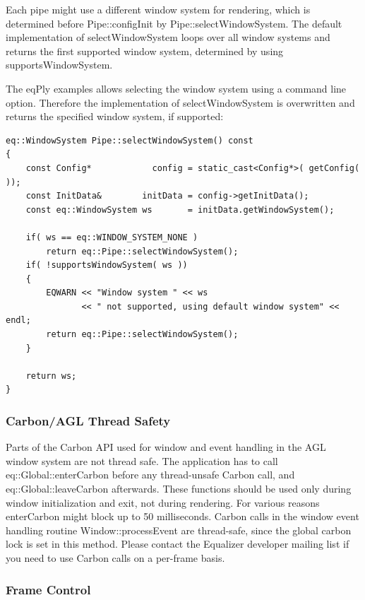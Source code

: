 \documentclass[10pt,a4]{scrartcl}
\begin{document}
Each pipe might use a different window system for rendering, which is
determined before \textsf{Pipe::configInit} by
\textsf{Pipe::selectWindowSystem}. The default implementation of
\textsf{selectWindowSystem} loops over all window systems and returns
the first supported window system, determined by using
\textsf{supportsWindowSystem}.

The \textsf{eqPly} examples allows selecting the window system using a
command line option. Therefore the implementation of
\textsf{selectWindowSystem} is overwritten and returns the specified
window system, if supported:

{\footnotesize\begin{lstlisting}
eq::WindowSystem Pipe::selectWindowSystem() const
{
    const Config*            config = static_cast<Config*>( getConfig( ));
    const InitData&        initData = config->getInitData();
    const eq::WindowSystem ws       = initData.getWindowSystem();

    if( ws == eq::WINDOW_SYSTEM_NONE )
        return eq::Pipe::selectWindowSystem();
    if( !supportsWindowSystem( ws ))
    {
        EQWARN << "Window system " << ws 
               << " not supported, using default window system" << endl;
        return eq::Pipe::selectWindowSystem();
    }

    return ws;
}
\end{lstlisting}}%

\subsubsection{\label{sCarbonThread}Carbon/AGL Thread Safety}

Parts of the Carbon API used for window and event handling in the AGL
window system are not thread safe. The application has to call
\textsf{eq::Global::enterCarbon} before any thread-unsafe Carbon call,
and \textsf{eq::Global::leaveCarbon} afterwards. These functions should
be used only during window initialization and exit, not during
rendering. For various reasons \textsf{enterCarbon} might block up to 50
milliseconds. Carbon calls in the window event handling routine
\textsf{Window::processEvent} are thread-safe, since the global carbon
lock is set in this method. Please contact the Equalizer developer
mailing list if you need to use Carbon calls on a per-frame basis.

\subsubsection{Frame Control}
\end{document}
